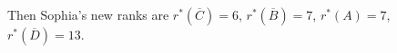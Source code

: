 Then Sophia's new ranks are $r^*\left(\overline{C}\right)=6$, $r^*\left(\overline{B}\right)=7$, $r^*\left(A\right)=7$, $r^*\left(\overline{D}\right)=13$.

